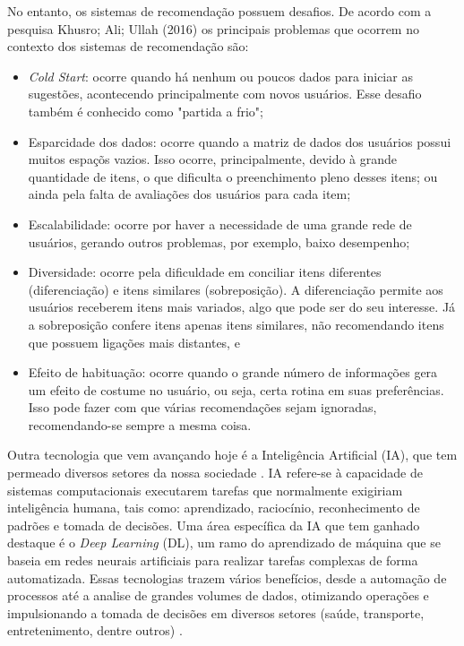 No entanto, os sistemas de recomendação possuem desafios. De acordo com a pesquisa Khusro; Ali; Ullah (2016)  
os principais problemas que ocorrem no contexto dos sistemas de recomendação são:
\begin{itemize}
\item \textit{Cold Start}: ocorre quando há nenhum ou poucos dados para iniciar as sugestões, acontecendo principalmente 
com novos usuários. Esse desafio também é conhecido como "partida a frio";
\item Esparcidade dos dados: ocorre quando a matriz de dados dos usuários possui  muitos espaçõs vazios. Isso ocorre, principalmente,
devido à grande quantidade de itens, o que dificulta o preenchimento pleno desses itens; ou ainda pela falta de avaliações
dos usuários para cada item;
\item Escalabilidade: ocorre por haver a necessidade de uma grande rede de usuários, gerando outros problemas, por exemplo,
baixo desempenho;
\item Diversidade: ocorre pela dificuldade em conciliar itens diferentes (diferenciação) e itens similares (sobreposição). A
diferenciação permite aos usuários receberem itens mais variados, algo que pode ser do seu interesse. Já a sobreposição confere itens
apenas itens similares, não recomendando itens que possuem ligações mais distantes, e
\item Efeito de habituação: ocorre quando o grande número de informações gera um efeito de costume no usuário, ou seja,
certa rotina em suas preferências. Isso pode fazer com que várias recomendações sejam ignoradas, recomendando-se sempre a mesma
coisa.
\end{itemize}

Outra tecnologia que vem avançando hoje é a Inteligência Artificial (IA), que tem permeado diversos setores da nossa sociedade \cite{perspectiva-dados-IA-2023}. IA refere-se à capacidade de sistemas computacionais executarem tarefas que 
normalmente exigiriam inteligência humana, tais como: aprendizado, raciocínio, reconhecimento de padrões e tomada de decisões. 
Uma área específica da IA que tem ganhado destaque é o \textit{Deep Learning} (DL), um ramo do aprendizado de 
máquina que se baseia em redes neurais artificiais para realizar tarefas complexas de forma automatizada.
Essas tecnologias trazem vários benefícios, desde a automação de processos até a analise de grandes volumes de dados, 
otimizando operações e impulsionando a tomada de decisões em diversos setores (saúde, transporte, entretenimento, dentre outros)
\cite{Suleimenov}.

